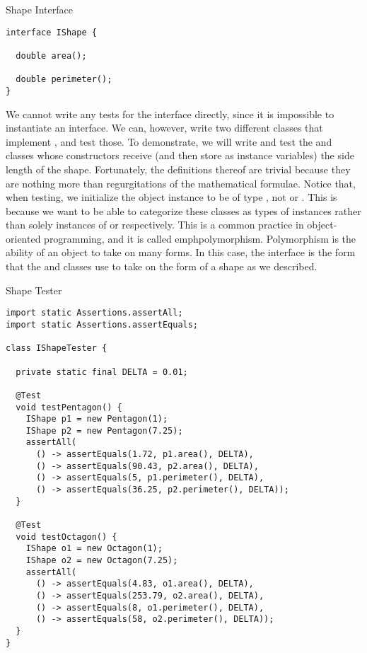 \begin{cl}[]{Shape Interface}
\begin{lstlisting}[language=MyJava]
interface IShape {

  double area();

  double perimeter();
}
\end{lstlisting}
\end{cl}

We cannot write any tests for the  interface directly, since it is impossible to instantiate an interface. We can, however, write two different classes that implement , and test those. To demonstrate, we will write and test the  and  classes whose constructors receive (and then store as instance variables) the side length of the shape. Fortunately, the definitions thereof are trivial because they are nothing more than regurgitations of the mathematical formulae. Notice that, when testing, we initialize the object instance to be of type , not  or . This is because we want to be able to categorize these classes as types of  instances rather than solely instances of  or  respectively. This is a common practice in object-oriented programming, and it is called emph{polymorphism}. Polymorphism is the ability of an object to take on many forms. In this case, the  interface is the form that the  and  classes use to take on the form of a shape as we described.

\begin{cl}[]{Shape Tester}
\begin{lstlisting}[language=MyJava]
import static Assertions.assertAll;
import static Assertions.assertEquals;

class IShapeTester {

  private static final DELTA = 0.01;
  
  @Test
  void testPentagon() {
    IShape p1 = new Pentagon(1);
    IShape p2 = new Pentagon(7.25);
    assertAll(
      () -> assertEquals(1.72, p1.area(), DELTA),
      () -> assertEquals(90.43, p2.area(), DELTA),
      () -> assertEquals(5, p1.perimeter(), DELTA),
      () -> assertEquals(36.25, p2.perimeter(), DELTA));
  }

  @Test
  void testOctagon() {
    IShape o1 = new Octagon(1);
    IShape o2 = new Octagon(7.25);
    assertAll(
      () -> assertEquals(4.83, o1.area(), DELTA),
      () -> assertEquals(253.79, o2.area(), DELTA),
      () -> assertEquals(8, o1.perimeter(), DELTA),
      () -> assertEquals(58, o2.perimeter(), DELTA));
  }
}
\end{lstlisting}
\end{cl}

